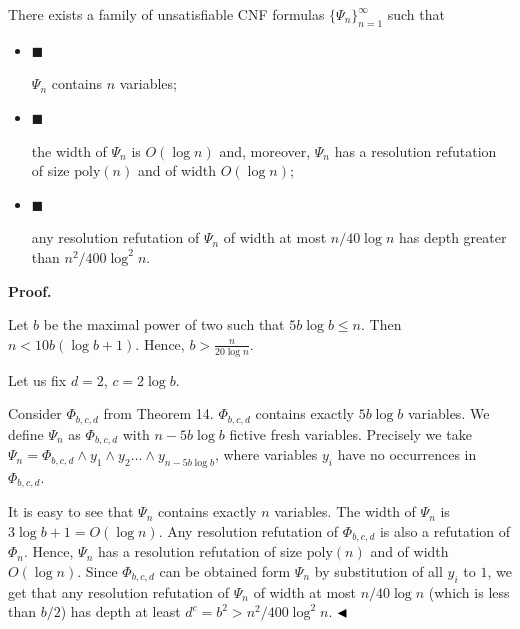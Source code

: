 There exists a family of unsatisfiable CNF formulas $\{\Psi_{n}\}_{n=1}^{\infty}$ such that\par


\begin{itemize}


\item 
$\blacksquare$ 


$\Psi_{n}$ contains $n$ variables;\par





\item 
$\blacksquare$ 


the width of $\Psi_{n}$ is $O(\log n)$ and, moreover,
$\Psi_{n}$ has a resolution refutation of size $\mathrm{poly}(n)$ and of
width $O(\log n)$;\par





\item 
$\blacksquare$ 


any resolution refutation of $\Psi_{n}$ of width at most $n/40\log n$
has depth greater than $n^{2}/400\log^{2}n$.\par





\end{itemize}



\par\medskip\noindent\textbf{Proof.}\par


Let $b$ be the maximal power of two such that $5b\log b\leq n$.
Then $n<10b(\log b+1)$. Hence, $b>\frac{n}{20\log n}$.\par



Let us fix $d=2$, $c=2\log b$.\par



Consider $\Phi_{b,c,d}$ from Theorem 14. $\Phi_{b,c,d}$
contains exactly $5b\log b$ variables. We define $\Psi_{n}$ as $\Phi_{b,c,d}$
with $n-5b\log b$ fictive fresh variables.
Precisely we take $\Psi_{n}=\Phi_{b,c,d}\land y_{1}\land y_{2}\dots\land y_{n-5b\log b}$,
where variables $y_{i}$ have no occurrences in $\Phi_{b,c,d}$.\par



It is easy to see that $\Psi_{n}$ contains exactly $n$ variables.
The width of $\Psi_{n}$ is $3\log b+1=O(\log n)$. Any resolution refutation of
$\Phi_{b,c,d}$ is also a refutation of $\Phi_{n}$.
Hence, $\Psi_{n}$ has a resolution refutation of size $\mathrm{poly}(n)$ and of width $O(\log n)$.
Since $\Phi_{b,c,d}$ can be obtained form $\Psi_{n}$ by substitution of all $y_{i}$ to $1$,
we get that any resolution refutation of $\Psi_{n}$ of width at most $n/40\log n$
(which is less than $b/2$) has depth at least $d^{c}=b^{2}>n^{2}/400\log^{2}n$.
$\hfill\blacktriangleleft$\par


